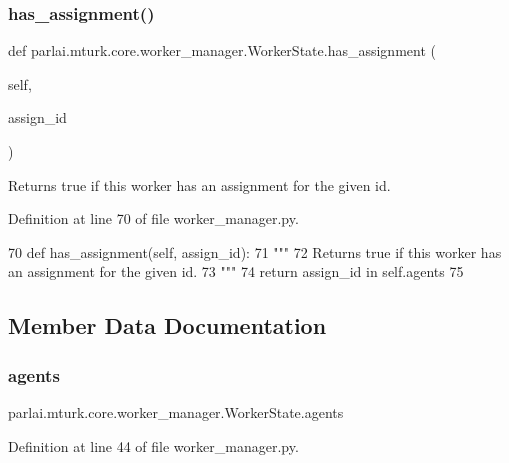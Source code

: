 \subsubsection{\texorpdfstring{has\+\_\+assignment()}{has\_assignment()}}
{\footnotesize\ttfamily def parlai.\+mturk.\+core.\+worker\+\_\+manager.\+Worker\+State.\+has\+\_\+assignment (\begin{DoxyParamCaption}\item[{}]{self,  }\item[{}]{assign\+\_\+id }\end{DoxyParamCaption})}

\begin{DoxyVerb}Returns true if this worker has an assignment for the given id.
\end{DoxyVerb}
 

Definition at line 70 of file worker\+\_\+manager.\+py.


\begin{DoxyCode}
70     \textcolor{keyword}{def }has\_assignment(self, assign\_id):
71         \textcolor{stringliteral}{"""}
72 \textcolor{stringliteral}{        Returns true if this worker has an assignment for the given id.}
73 \textcolor{stringliteral}{        """}
74         \textcolor{keywordflow}{return} assign\_id \textcolor{keywordflow}{in} self.agents
75 
\end{DoxyCode}


\subsection{Member Data Documentation}
\mbox{\label{classparlai_1_1mturk_1_1core_1_1worker__manager_1_1WorkerState_a53912abee55c0bd1caaf5575c001d575}} 
\subsubsection{\texorpdfstring{agents}{agents}}
{\footnotesize\ttfamily parlai.\+mturk.\+core.\+worker\+\_\+manager.\+Worker\+State.\+agents}



Definition at line 44 of file worker\+\_\+manager.\+py.

